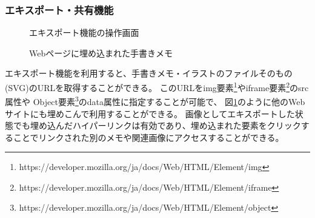 \subsubsection{エキスポート・共有機能}

\begin{figure}[htbp] \begin{minipage}{0.5\hsize}
                         \begin{center} 
                         \end{center} \caption{エキスポート機能の操作画面} \label{fig:exporting1}
\end{minipage} \begin{minipage}{0.5\hsize}
                   \begin{center} 
                   \end{center} \caption{Webページに埋め込まれた手書きメモ} \label{fig:exporting2}
\end{minipage}
\end{figure}
エキスポート機能を利用すると、手書きメモ・イラストのファイルそのもの(SVG)のURLを取得することができる。
このURLをimg要素\footnote{https://developer.mozilla.org/ja/docs/Web/HTML/Element/img}やiframe要素\footnote{https://developer.mozilla.org/ja/docs/Web/HTML/Element/iframe}のsrc属性や
Object要素\footnote{https://developer.mozilla.org/ja/docs/Web/HTML/Element/object}のdata属性に指定することが可能で、
図\ref{fig:exporting2}のように他のWebサイトにも埋めこんで利用することができる。
画像としてエキスポートした状態でも埋め込んだハイパーリンクは有効であり、埋め込まれた要素をクリックすることでリンクされた別のメモや関連画像にアクセスすることができる。


